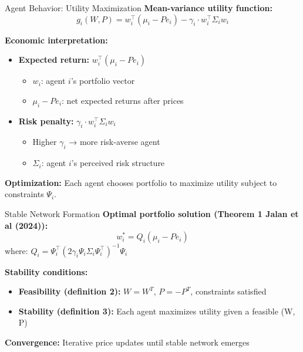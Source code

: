 \documentclass[aspectratio=169]{beamer}
\begin{document}
\begin{frame}{Agent Behavior: Utility Maximization}
\textbf{Mean-variance utility function:}
\begin{equation}
g_i(W,P) = w_i^\top (\mu_i - P e_i) - \gamma_i \cdot w_i^\top \Sigma_i w_i
\end{equation}

\vspace{0.3cm}
\textbf{Economic interpretation:}
\begin{itemize}
    \item \textbf{Expected return:} $w_i^\top (\mu_i - P e_i)$
    \begin{itemize}
        \item $w_i$: agent $i$'s portfolio vector
        \item $\mu_i - P e_i$: net expected returns after prices
    \end{itemize}
    
    \item \textbf{Risk penalty:} $\gamma_i \cdot w_i^\top \Sigma_i w_i$
    \begin{itemize}
        \item Higher $\gamma_i$ → more risk-averse agent
        \item $\Sigma_i$: agent $i$'s perceived risk structure
    \end{itemize}
\end{itemize}

\vspace{0.3cm}
\textbf{Optimization:} Each agent chooses portfolio to maximize utility subject to constraints $\Psi_i$.
\end{frame}

\begin{frame}{Stable Network Formation}
\textbf{Optimal portfolio solution (Theorem 1 Jalan et al (2024)):}
$$w_i^* = Q_i(\mu_i - Pe_i)$$
where: $Q_i = \Psi_i^\top(2\gamma_i\Psi_i\Sigma_i\Psi_i^\top)^{-1}\Psi_i$

\vspace{0.3cm}
\textbf{Stability conditions:}
\begin{itemize}
    \item \textbf{Feasibility (definition 2):} $W = W^T$, $P = -P^T$, constraints satisfied
    \item \textbf{Stability (definition 3):} Each agent maximizes utility given a feasible (W, P)
\end{itemize}

\vspace{0.3cm}
\textbf{Convergence:} Iterative price updates until stable network emerges
\end{frame}
\end{document}
